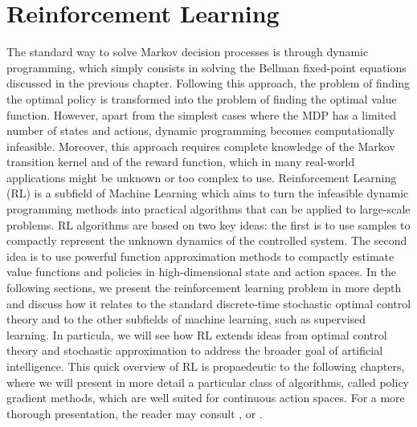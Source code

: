 \chapter{Reinforcement Learning}

The standard way to solve Markov decision processes is through dynamic programming, which simply consists in solving the Bellman fixed-point equations discussed in the previous chapter. Following this approach, the problem of finding the optimal policy is transformed into the problem of finding the optimal value function. However, apart from the simplest cases where the MDP has a limited number of states and actions, dynamic programming becomes computationally infeasible. Moreover, this approach requires complete knowledge of the Markov transition kernel and of the reward function, which in many real-world applications might be unknown or too complex to use. Reinforcement Learning (RL) is a subfield of Machine Learning which aims to turn the infeasible dynamic programming methods into practical algorithms that can be applied to large-scale problems. RL algorithms are based on two key ideas: the first is to use samples to compactly represent the unknown dynamics of the controlled system. The second idea is to use powerful function approximation methods to compactly estimate value functions and policies in high-dimensional state and action spaces. In the following sections, we present the reinforcement learning problem in more depth and discuss how it relates to the standard discrete-time stochastic optimal control theory and to the other subfields of machine learning, such as supervised learning. In particula, we will see how RL extends ideas from optimal control theory and stochastic approximation to address the broader goal of artificial intelligence. This quick overview of RL is propaedeutic to the following chapters, where we will present in more detail a particular class of algorithms, called policy gradient methods, which are well suited for continuous action spaces. For a more thorough presentation, the reader may consult \cite{sutton1998introduction}, \cite{szepesvari2010algorithms} or \cite{wiering2012reinforcement}.

